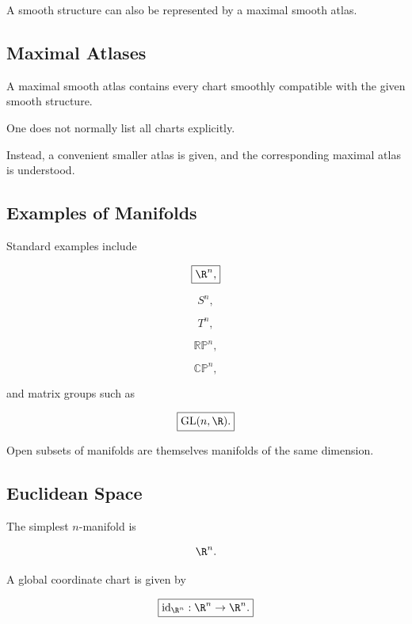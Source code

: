 A smooth structure can also be represented by a maximal smooth atlas.

\subsection{Maximal Atlases}
\label{subsec:maximal-atlases}

A maximal smooth atlas contains every chart smoothly compatible with the
given smooth structure.

One does not normally list all charts explicitly.

Instead, a convenient smaller atlas is given, and the corresponding maximal
atlas is understood.

\subsection{Examples of Manifolds}
\label{subsec:examples-manifolds}

Standard examples include

\[
\boxed{
\R^n,
}
\]

\[
\boxed{
S^n,
}
\]

\[
\boxed{
T^n,
}
\]

\[
\boxed{
\mathbb{RP}^n,
}
\]

\[
\boxed{
\mathbb{CP}^n,
}
\]

and matrix groups such as

\[
\boxed{
\mathrm{GL}(n,\R).
}
\]

Open subsets of manifolds are themselves manifolds of the same dimension.

\subsection{Euclidean Space}
\label{subsec:euclidean-space-manifold}

The simplest \(n\)-manifold is

\[
\R^n.
\]

A global coordinate chart is given by

\[
\boxed{
\operatorname{id}_{\R^n}:\R^n\to\R^n.
}
\]

